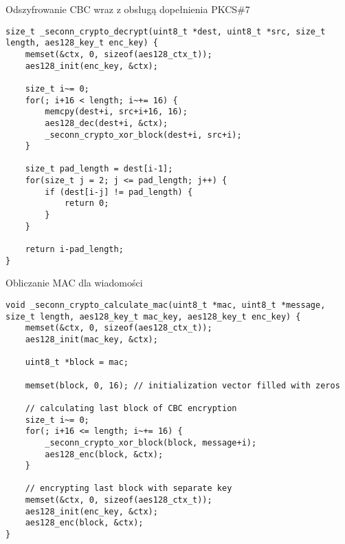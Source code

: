 \begin{table}
\caption{Odszyfrowanie CBC wraz z obsługą dopełnienia PKCS\#7}
\label{lst:decrypt}
\begin{lstlisting}
size_t _seconn_crypto_decrypt(uint8_t *dest, uint8_t *src, size_t length, aes128_key_t enc_key) {
    memset(&ctx, 0, sizeof(aes128_ctx_t));
    aes128_init(enc_key, &ctx);

    size_t i~= 0;
    for(; i+16 < length; i~+= 16) {
        memcpy(dest+i, src+i+16, 16);
        aes128_dec(dest+i, &ctx);
        _seconn_crypto_xor_block(dest+i, src+i);
    }

    size_t pad_length = dest[i-1];
    for(size_t j = 2; j <= pad_length; j++) {
        if (dest[i-j] != pad_length) {
            return 0;
        }
    }

    return i-pad_length;
}
\end{lstlisting}
\end{table}

\begin{table}
\caption{Obliczanie MAC dla wiadomości}
\label{lst:mac}
\begin{lstlisting}
void _seconn_crypto_calculate_mac(uint8_t *mac, uint8_t *message,
size_t length, aes128_key_t mac_key, aes128_key_t enc_key) {
    memset(&ctx, 0, sizeof(aes128_ctx_t));
    aes128_init(mac_key, &ctx);

    uint8_t *block = mac;

    memset(block, 0, 16); // initialization vector filled with zeros

    // calculating last block of CBC encryption
    size_t i~= 0;
    for(; i+16 <= length; i~+= 16) {
        _seconn_crypto_xor_block(block, message+i);
        aes128_enc(block, &ctx);
    }

    // encrypting last block with separate key
    memset(&ctx, 0, sizeof(aes128_ctx_t));
    aes128_init(enc_key, &ctx);
    aes128_enc(block, &ctx);
}
\end{lstlisting}
\end{table}
